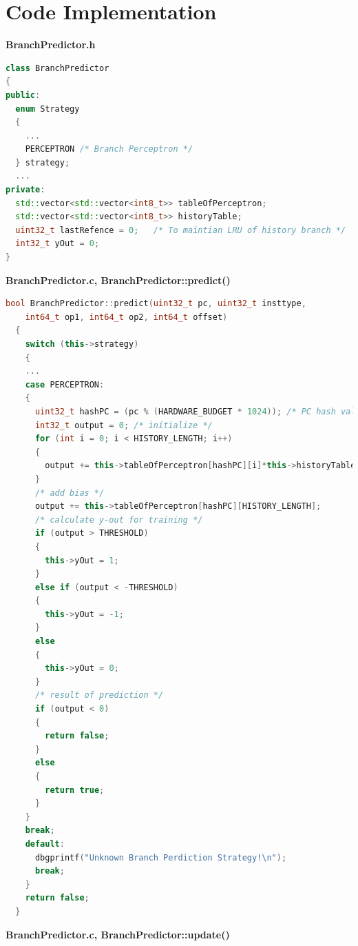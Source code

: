 \documentclass{article}
\begin{document}
\section{Code Implementation}
\textbf{BranchPredictor.h}
\begin{lstlisting}[language=c++]
class BranchPredictor
{
public:
  enum Strategy
  {
    ...
    PERCEPTRON /* Branch Perceptron */
  } strategy;
  ...
private:
  std::vector<std::vector<int8_t>> tableOfPerceptron;
  std::vector<std::vector<int8_t>> historyTable;
  uint32_t lastRefence = 0;   /* To maintian LRU of history branch */
  int32_t yOut = 0;
}
\end{lstlisting}
\textbf{BranchPredictor.c, BranchPredictor::predict()}
\begin{lstlisting}[language=c++]
bool BranchPredictor::predict(uint32_t pc, uint32_t insttype, 
    int64_t op1, int64_t op2, int64_t offset)
  {
    switch (this->strategy)
    {
    ...
    case PERCEPTRON:
    {
      uint32_t hashPC = (pc % (HARDWARE_BUDGET * 1024)); /* PC hash value */
      int32_t output = 0; /* initialize */
      for (int i = 0; i < HISTORY_LENGTH; i++)
      {
        output += this->tableOfPerceptron[hashPC][i]*this->historyTable[i][0];
      }
      /* add bias */
      output += this->tableOfPerceptron[hashPC][HISTORY_LENGTH];
      /* calculate y-out for training */
      if (output > THRESHOLD)
      {
        this->yOut = 1;
      }
      else if (output < -THRESHOLD)
      {
        this->yOut = -1;
      }
      else
      {
        this->yOut = 0;
      }
      /* result of prediction */
      if (output < 0)
      {
        return false;
      }
      else
      {
        return true;
      }
    }
    break;
    default:
      dbgprintf("Unknown Branch Perdiction Strategy!\n");
      break;
    }
    return false;
  }
\end{lstlisting}
\textbf{BranchPredictor.c, BranchPredictor::update()}
\end{document}
